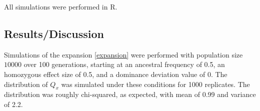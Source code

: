 \documentclass[a4paper,11pt]{article}
\begin{document}
All simulations were performed in R. 

\subsection*{Results/Discussion}
Simulations of the expansion \eqref{expansion} were performed with
population size $10000$ over 100 generations, starting at an ancestral
frequency of 0.5, an homozygous effect size of 0.5, and a dominance
deviation value of 0. The distribution of $Q_x$ was simulated under
these conditions for 1000 replicates. The distribution was roughly
chi-squared, as expected, with mean of 0.99 and variance of 2.2.  



\pagebreak



\end{document}
